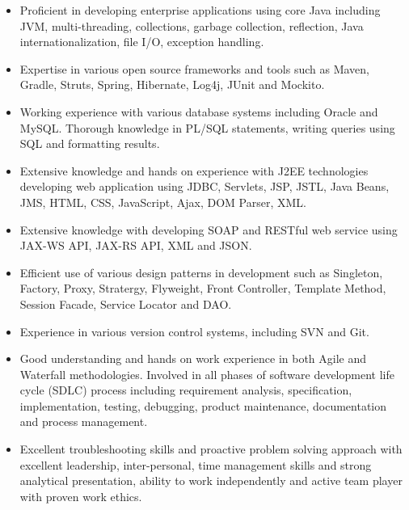 \documentclass{harnon-cv}
\begin{document}
\maketitle

\begin{comment}
\addheadertext{Objective}
A challenging position in the field of Software Engineering.
\end{comment}

\begin{itemize}\itemsep1pt
\item Proficient in developing enterprise applications using core Java including JVM, multi-threading, collections, garbage collection, reflection, Java internationalization, file I/O, exception handling.
\item Expertise in various open source frameworks and tools such as Maven, Gradle, Struts, Spring, Hibernate, Log4j, JUnit and Mockito.
\item Working experience with various database systems including Oracle and MySQL. Thorough knowledge in PL/SQL statements, writing queries using SQL and formatting results.
\item Extensive knowledge and hands on experience with J2EE technologies developing web application using JDBC, Servlets, JSP, JSTL, Java Beans, JMS, HTML, CSS, JavaScript, Ajax, DOM Parser, XML.
\item Extensive knowledge with developing SOAP and RESTful web service using JAX-WS API, JAX-RS API, XML and JSON.
\item Efficient use of various design patterns in development such as Singleton, Factory, Proxy, Stratergy, Flyweight, Front Controller, Template Method, Session Facade, Service Locator and DAO.
\item Experience in various version control systems, including SVN and Git.
\item Good understanding and hands on work experience in both Agile and Waterfall methodologies. Involved in all phases of software development life cycle (SDLC) process including requirement analysis, specification, implementation, testing, debugging, product maintenance, documentation and process management.
\item Excellent troubleshooting skills and proactive problem solving approach with excellent leadership, inter-personal, time management skills and strong analytical presentation, ability to work independently and active team player with proven work ethics.
\end{itemize}\par
\end{document}
